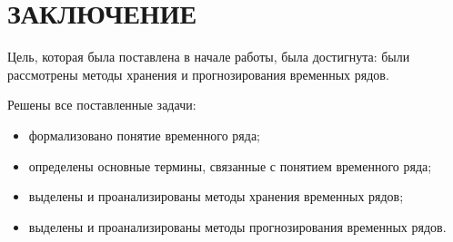 \chapter*{ЗАКЛЮЧЕНИЕ}

Цель, которая была поставлена в начале работы, была достигнута:
были рассмотрены методы хранения и прогнозирования временных рядов.

Решены все поставленные задачи:

\begin{itemize}[label=—]
	\item формализовано понятие временного ряда;
	\item определены основные термины, связанные с понятием временного ряда;
	\item выделены и проанализированы методы хранения временных рядов;
	\item выделены и проанализированы методы прогнозирования временных рядов.
\end{itemize}